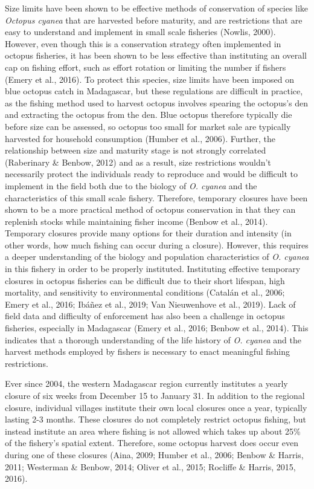 \documentclass[
]{article}
\begin{document}
Size limits have been shown to be effective methods of conservation of species like \emph{Octopus cyanea} that are harvested before maturity, and are restrictions that are easy to understand and implement in small scale fisheries (Nowlis, 2000). However, even though this is a conservation strategy often implemented in octopus fisheries, it has been shown to be less effective than instituting an overall cap on fishing effort, such as effort rotation or limiting the number if fishers (Emery et al., 2016). To protect this species, size limits have been imposed on blue octopus catch in Madagascar, but these regulations are difficult in practice, as the fishing method used to harvest octopus involves spearing the octopus's den and extracting the octopus from the den. Blue octopus therefore typically die before size can be assessed, so octopus too small for market sale are typically harvested for household consumption (Humber et al., 2006). Further, the relationship between size and maturity stage is not strongly correlated (Raberinary \& Benbow, 2012) and as a result, size restrictions wouldn't necessarily protect the individuals ready to reproduce and would be difficult to implement in the field both due to the biology of \emph{O. cyanea} and the characteristics of this small scale fishery. Therefore, temporary closures have been shown to be a more practical method of octopus conservation in that they can replenish stocks while maintaining fisher income (Benbow et al., 2014). Temporary closures provide many options for their duration and intensity (in other words, how much fishing can occur during a closure). However, this requires a deeper understanding of the biology and population characteristics of \emph{O. cyanea} in this fishery in order to be properly instituted. Instituting effective temporary closures in octopus fisheries can be difficult due to their short lifespan, high mortality, and sensitivity to environmental conditions (Catalán et al., 2006; Emery et al., 2016; Ibáñez et al., 2019; Van Nieuwenhove et al., 2019). Lack of field data and difficulty of enforcement has also been a challenge in octopus fisheries, especially in Madagascar (Emery et al., 2016; Benbow et al., 2014). This indicates that a thorough understanding of the life history of \emph{O. cyanea} and the harvest methods employed by fishers is necessary to enact meaningful fishing restrictions.

Ever since 2004, the western Madagascar region currently institutes a yearly closure of six weeks from December 15 to January 31. In addition to the regional closure, individual villages institute their own local closures once a year, typically lasting 2-3 months. These closures do not completely restrict octopus fishing, but instead institute an area where fishing is not allowed which takes up about 25\% of the fishery's spatial extent. Therefore, some octopus harvest does occur even during one of these closures (Aina, 2009; Humber et al., 2006; Benbow \& Harris, 2011; Westerman \& Benbow, 2014; Oliver et al., 2015; Rocliffe \& Harris, 2015, 2016).
\end{document}
